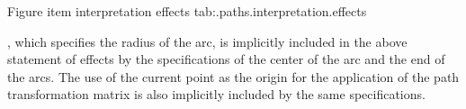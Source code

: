 \begin{libreqtab2a} {Figure item interpretation effects} {tab:\iotwod.paths.interpretation.effects}
\begin{note} , which specifies the radius of the arc, is implicitly included in the above statement of effects by the specifications of the center of the arc and the end of the arcs. The use of the current point as the origin for the application of the path transformation matrix is also implicitly included by the same specifications. \end{note} \\
\end{libreqtab2a}
